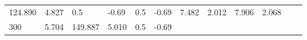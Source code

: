 \documentclass{article}
\begin{document}
\begin{longtable}[]{@{}llllllllllll@{}}
\begin{minipage}[t]{0.06\columnwidth}
124.890\strut
\end{minipage} & \begin{minipage}[t]{0.08\columnwidth}\raggedright\strut
4.827\strut
\end{minipage} & \begin{minipage}[t]{0.03\columnwidth}\raggedright\strut
0.5\strut
\end{minipage} & \begin{minipage}[t]{0.06\columnwidth}\raggedright\strut
-0.69\strut
\end{minipage} & \begin{minipage}[t]{0.03\columnwidth}\raggedright\strut
0.5\strut
\end{minipage} & \begin{minipage}[t]{0.06\columnwidth}\raggedright\strut
-0.69\strut
\end{minipage} & \begin{minipage}[t]{0.06\columnwidth}\raggedright\strut
7.482\strut
\end{minipage} & \begin{minipage}[t]{0.08\columnwidth}\raggedright\strut
2.012\strut
\end{minipage} & \begin{minipage}[t]{0.06\columnwidth}\raggedright\strut
7.906\strut
\end{minipage} & \begin{minipage}[t]{0.09\columnwidth}\raggedright\strut
2.068\strut
\end{minipage}\tabularnewline
\begin{minipage}[t]{0.03\columnwidth}\raggedright\strut
300\strut
\end{minipage} & \begin{minipage}[t]{0.06\columnwidth}\raggedright\strut
5.704\strut
\end{minipage} & \begin{minipage}[t]{0.06\columnwidth}\raggedright\strut
149.887\strut
\end{minipage} & \begin{minipage}[t]{0.08\columnwidth}\raggedright\strut
5.010\strut
\end{minipage} & \begin{minipage}[t]{0.03\columnwidth}\raggedright\strut
0.5\strut
\end{minipage} & \begin{minipage}[t]{0.06\columnwidth}\raggedright\strut
-0.69\strut
\end{minipage} & \begin{minipage}[t]{0.03\columnwidth}\raggedright\strut

\end{minipage}
\end{longtable}
\end{document}
